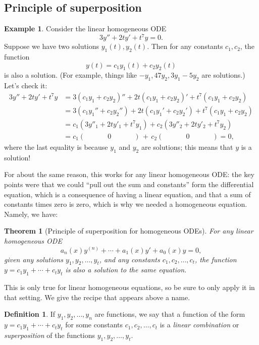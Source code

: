 \documentclass[12pt]{amsart}
\numberwithin{equation}{section}
\theoremstyle{plain} %
\newtheorem{thm}[equation]{Theorem}
\theoremstyle{definition}
\newtheorem{defn}[equation]{Definition}
\newtheorem{ex}[equation]{Example}
\theoremstyle{remark}
\begin{document}
\subsection*{Principle of superposition}

\begin{ex}\label{ex:homog1} Consider the linear homogeneous ODE
\[ 3y'' + 2ty' + t^7 y = 0.\]
Suppose we have two solutions $y_1(t), y_2(t)$. Then for any constants $c_1,c_2$, the function
\[ y(t) = c_1 y_1(t) + c_2 y_2(t)\] is also a solution. (For example, things like $-y_1, 47 y_2, 3 y_1 - 5 y_2$ are solutions.)
Let's check it:
\begin{align*} 3 y'' + 2t y' + t^7 y &= 3 (c_1 y_1 + c_2 y_2)'' + 2t (c_1 y_1 + c_2 y_2)' + t^7 (c_1 y_1 + c_2 y_2) \\ &=3 (c_1 y_1'' + c_2 y_2'') + 2t (c_1 y_1' + c_2 y_2') + t^7 (c_1 y_1 + c_2 y_2)\\
&= c_1 (3y''_1 + 2ty'_1 + t^7 y_1) + c_2 (3y''_2 + 2ty'_2 + t^7 y_2) \\
&= c_1 (  \qquad \quad \  0 \qquad \quad \  )  \,+ \,c_2 (  \qquad \quad \  0 \qquad \quad \  ) = 0,
\end{align*}
where the last equality is because $y_1$ and $y_2$ are solutions; this means that $y$ is a solution!
\end{ex}


For about the same reason, this works for any linear homogeneous ODE: the key points were that we could ``pull out the sum and constants'' form the differential equation, which is a consequence of having a linear equation, and that a sum of constants times zero is zero, which is why we needed a homogeneous equation.  Namely, we have:

\begin{thm}[Principle of superposition for homogeneous ODEs] For any linear homogeneous ODE
\[ a_n(x) y^{(n)} +  \cdots + a_1(x) y' +  a_0(x) y = 0,\]
 given any solutions $y_1,y_2,\dots,y_t$, and any constants $c_1,c_2, \dots,c_t$, the function $y=c_1 y_1 + \cdots + c_t y_t$ is also a solution to the same equation.
\end{thm}

This is only true for linear homogeneous equations, so be sure to only apply it in that setting. We give the recipe that appears above a name.

\begin{defn} If $y_1,y_2,\dots,y_n$ are functions, we say that a function of the form $y=c_1 y_1 + \cdots + c_t y_t$ for some constants $c_1,c_2, \dots,c_t$ is a \emph{linear combination} or \emph{superposition} of the functions $y_1,y_2,\dots,y_t$.\end{defn}
\end{document}

